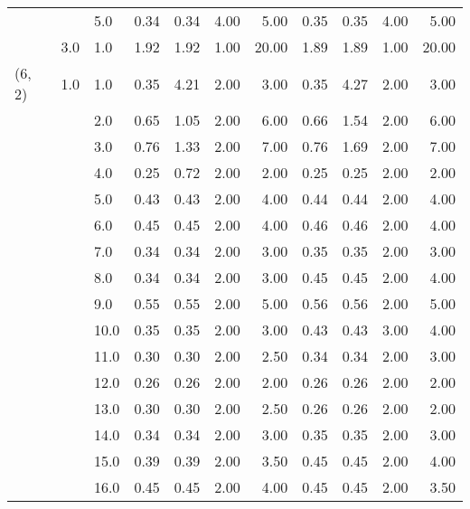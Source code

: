 \begin{tabular}{lllrrrrrrrr}
       &     & 5.0  &       0.34 &      0.34 & 4.00 &   5.00 &       0.35 &      0.35 & 4.00 &   5.00 \\
       & 3.0 & 1.0  &       1.92 &      1.92 & 1.00 &  20.00 &       1.89 &      1.89 & 1.00 &  20.00 \\
(6, 2) & 1.0 & 1.0  &       0.35 &      4.21 & 2.00 &   3.00 &       0.35 &      4.27 & 2.00 &   3.00 \\
       &     & 2.0  &       0.65 &      1.05 & 2.00 &   6.00 &       0.66 &      1.54 & 2.00 &   6.00 \\
       &     & 3.0  &       0.76 &      1.33 & 2.00 &   7.00 &       0.76 &      1.69 & 2.00 &   7.00 \\
       &     & 4.0  &       0.25 &      0.72 & 2.00 &   2.00 &       0.25 &      0.25 & 2.00 &   2.00 \\
       &     & 5.0  &       0.43 &      0.43 & 2.00 &   4.00 &       0.44 &      0.44 & 2.00 &   4.00 \\
       &     & 6.0  &       0.45 &      0.45 & 2.00 &   4.00 &       0.46 &      0.46 & 2.00 &   4.00 \\
       &     & 7.0  &       0.34 &      0.34 & 2.00 &   3.00 &       0.35 &      0.35 & 2.00 &   3.00 \\
       &     & 8.0  &       0.34 &      0.34 & 2.00 &   3.00 &       0.45 &      0.45 & 2.00 &   4.00 \\
       &     & 9.0  &       0.55 &      0.55 & 2.00 &   5.00 &       0.56 &      0.56 & 2.00 &   5.00 \\
       &     & 10.0 &       0.35 &      0.35 & 2.00 &   3.00 &       0.43 &      0.43 & 3.00 &   4.00 \\
       &     & 11.0 &       0.30 &      0.30 & 2.00 &   2.50 &       0.34 &      0.34 & 2.00 &   3.00 \\
       &     & 12.0 &       0.26 &      0.26 & 2.00 &   2.00 &       0.26 &      0.26 & 2.00 &   2.00 \\
       &     & 13.0 &       0.30 &      0.30 & 2.00 &   2.50 &       0.26 &      0.26 & 2.00 &   2.00 \\
       &     & 14.0 &       0.34 &      0.34 & 2.00 &   3.00 &       0.35 &      0.35 & 2.00 &   3.00 \\
       &     & 15.0 &       0.39 &      0.39 & 2.00 &   3.50 &       0.45 &      0.45 & 2.00 &   4.00 \\
       &     & 16.0 &       0.45 &      0.45 & 2.00 &   4.00 &       0.45 &      0.45 & 2.00 &   3.50 \\

\end{tabular}
